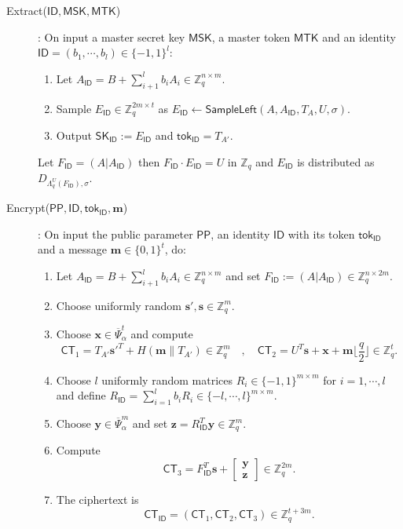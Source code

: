 \documentclass[runningheads]{llncs}
\def\ZZ{\mathbb{Z}}
\def\bf{\mathbf}
\def\SK{\mathsf{SK}}
\def\PP{\mathsf{PP}}
\def\MSK{\mathsf{MSK}}
\def\MTK{\mathsf{MTK}}
\def\tok{\mathsf{tok}}
\def\CT{\mathsf{CT}}
\def\SampleLeft{\mathsf{SampleLeft}}
\def\ID{\mathsf{ID}}
\begin{document}
\begin{description}
		\item[Extract($\ID,\MSK,\MTK$)]: On input  a master secret key $\MSK$, a master token $\MTK$ and an identity $\ID=(b_1,\cdots,b_l)\in\{-1,1\}^l$:
		\begin{enumerate}
			\item Let $A_{\ID} =B + \sum_{i+1}^lb_iA_i\in\ZZ_q^{n\times m}$.
			\item Sample $E_\ID\in\ZZ_q^{2m\times t}$ as $E_\ID\gets\SampleLeft(A,A_{\ID},T_A,U,\sigma).$
			\item Output $\SK_\ID:=E_\ID$ and $\tok_\ID=T_{A'}$.
		\end{enumerate}
		Let $F_\ID=(A|A_\ID)$ then $F_\ID\cdot E_\ID = U $ in $\ZZ_q$ and $E_\ID$ is distributed as $D_{\Lambda_q^U(F_\ID),\sigma}$.
		\item[Encrypt($\PP,\ID,\tok_\ID,\bf{m}$)]: On input the public parameter $\PP$, an identity $\ID$ with its token $\tok_\ID$ and a message $\bf{m}\in\{0,1\}^t$, do:
		\begin{enumerate}
			\item Let $A_{\ID} =B + \sum_{i+1}^lb_iA_i\in\ZZ_q^{n\times m}$ and set $F_\ID:=(A|A_\ID)\in\ZZ_q^{n\times 2m}$.
			\item Choose uniformly random $\bf{s}', \bf{s}\in\ZZ_q^m$.
			\item Choose $\bf{x}\in\overline{\Psi}_\alpha^t$ and compute
			$$\CT_1 = T_{A'}\bf{s}'^T + H(\bf{m}\|T_{A'})\in\ZZ_q^m\quad,\quad
			\CT_2 = U^T\bf{s} +\bf{x} +\bf{m}\big\lfloor\frac{q}{2}\big\rfloor\in\ZZ_q^t.$$
			\item Choose $l$ uniformly random matrices $R_i\in\{-1,1\}^{m\times m}$ for $i=1,\cdots,l$ and define $R_\ID=\sum_{i=1}^lb_iR_i\in\{-l,\cdots,l\}^{m\times m}$.
			\item Choose $\bf{y}\in\overline{\Psi}_\alpha^m$ and set $\bf{z}=R_\ID^T\bf{y}\in\ZZ_q^m$.
			\item Compute
			$$\CT_3=F_\ID^T\bf{s}+\left[\begin{array}{c}\bf{y}\\ \bf{z}\end{array}\right]\in\ZZ_q^{2m}.$$
			\item The ciphertext is $$\CT_\ID=(\CT_1,\CT_2,\CT_3)\in\ZZ_q^{t+3m}.$$    
		\end{enumerate}
		

\end{description}
\end{document}

